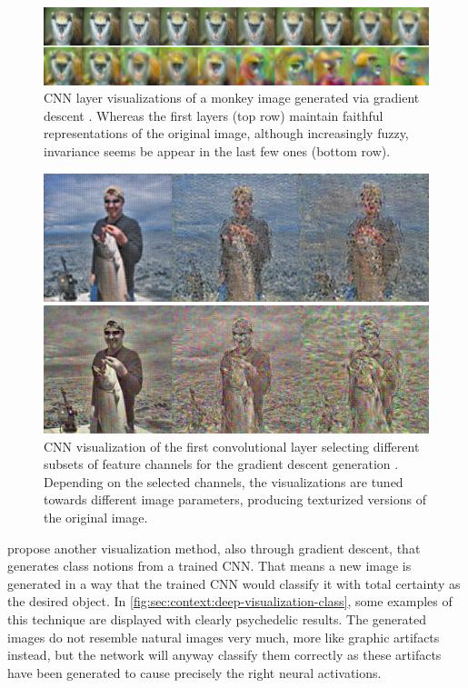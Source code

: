 \begin{figure}[htbp]
  \includegraphics[width=\textwidth]{gfx/deep-visualization-reconstructions-1}
  \caption{
    CNN layer visualizations of a monkey image generated via gradient descent \cite{Mahendran2014}.
    Whereas the first layers (top row) maintain faithful representations of the original image, although increasingly fuzzy, invariance seems be appear in the last few ones (bottom row).
  }
  \label{fig:sec:context:deep-visualization:deep-visualization-reconstructions-1}
\end{figure}

\begin{figure}[htbp]
  \includegraphics[width=\textwidth]{gfx/deep-visualization-reconstructions-2}
  \caption{
    CNN visualization of the first convolutional layer selecting different subsets of feature channels for the gradient descent generation \cite{Mahendran2014}.
    Depending on the selected channels, the visualizations are tuned towards different image parameters, producing texturized versions of the original image.
  }
  \label{fig:sec:context:deep-visualization:deep-visualization-reconstructions-2}
\end{figure}

\citet{Simonyan2014B} propose another visualization method, also through gradient descent, that generates class notions from a trained CNN.
That means a new image is generated in a way that the trained CNN would classify it with total certainty as the desired object.
In \autoref{fig:sec:context:deep-visualization-class}, some examples of this technique are displayed with clearly psychedelic results.
The generated images do not resemble natural images very much, more like graphic artifacts instead, but the network will anyway classify them correctly as these artifacts have been generated to cause precisely the right neural activations.

